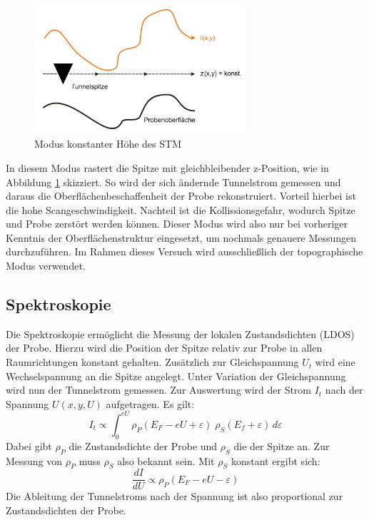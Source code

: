 \begin{figure}[h]
    \centering
    \includegraphics[width=0.7\textwidth]{Abb/konst.png}
    \caption{Modus konstanter Höhe des STM \cite{beschr}}
    \label{konst}
\end{figure}
In diesem Modus rastert die Spitze mit gleichbleibender z-Position, wie in Abbildung
\ref{konst} skizziert. So wird der
sich ändernde Tunnelstrom gemessen und daraus die Oberflächenbeschaffenheit der 
Probe rekonstruiert. Vorteil hierbei ist die hohe Scangeschwindigkeit. Nachteil
ist die Kollissionsgefahr, wodurch Spitze und Probe zerstört werden können. Dieser
Modus wird also nur bei vorheriger Kenntnis der Oberflächenstruktur eingesetzt, um 
nochmals genauere Messungen durchzuführen. Im Rahmen dieses Versuch wird 
ausschließlich der topographische Modus verwendet.

    \subsection{Spektroskopie}
    \label{spek}

Die Spektroskopie ermöglicht die Messung der lokalen Zustandsdichten (LDOS) der
Probe. Hierzu wird die Position der Spitze relativ zur Probe in allen Raumrichtungen
konstant gehalten. Zusätzlich zur Gleichspannung $U_t$ wird eine Wechselspannung an 
die Spitze angelegt. Unter Variation der Gleichspannung wird nun der Tunnelstrom
gemessen. Zur Auswertung wird der Strom $I_t$ nach der Spannung $U(x,y,U)$ 
aufgetragen. Es gilt:
\[
    I_t \propto \int_0^{eU} \rho_P (E_F - eU + \varepsilon) \; 
                            \rho_S (E_f + \varepsilon) \, d \varepsilon
\]
Dabei gibt $\rho_P$ die Zustandsdichte der Probe und $\rho_S$ die der Spitze an.
Zur Messung von $\rho_P$ muss $\rho_S$ also bekannt sein. Mit $\rho_S$ konstant
ergibt sich:
\[
    \frac{dI}{dU} \propto \rho_P (E_F - eU - \varepsilon)
\]
Die Ableitung der Tunnelstroms nach der Spannung ist also proportional zur 
Zustandsdichten der Probe. 
\cite{beschr}

